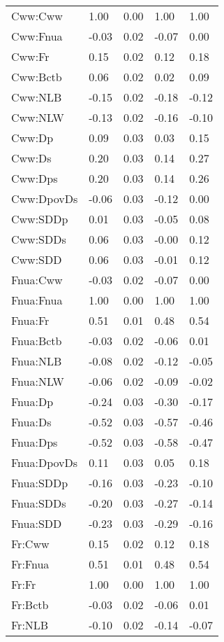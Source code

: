 \begin{center}
\begin{longtable}{|p{0.9in}|p{0.7in}|p{0.7in}|p{0.7in}|p{0.7in}|}
Cww:Cww & 1.00 & 0.00 & 1.00 & 1.00 \\ 
  Cww:Fnua & -0.03 & 0.02 & -0.07 & 0.00 \\ 
  Cww:Fr & 0.15 & 0.02 & 0.12 & 0.18 \\ 
  Cww:Bctb & 0.06 & 0.02 & 0.02 & 0.09 \\ 
  Cww:NLB & -0.15 & 0.02 & -0.18 & -0.12 \\ 
  Cww:NLW & -0.13 & 0.02 & -0.16 & -0.10 \\ 
  Cww:Dp & 0.09 & 0.03 & 0.03 & 0.15 \\ 
  Cww:Ds & 0.20 & 0.03 & 0.14 & 0.27 \\ 
  Cww:Dps & 0.20 & 0.03 & 0.14 & 0.26 \\ 
  Cww:DpovDs & -0.06 & 0.03 & -0.12 & 0.00 \\ 
  Cww:SDDp & 0.01 & 0.03 & -0.05 & 0.08 \\ 
  Cww:SDDs & 0.06 & 0.03 & -0.00 & 0.12 \\ 
  Cww:SDD & 0.06 & 0.03 & -0.01 & 0.12 \\ 
  Fnua:Cww & -0.03 & 0.02 & -0.07 & 0.00 \\ 
  Fnua:Fnua & 1.00 & 0.00 & 1.00 & 1.00 \\ 
  Fnua:Fr & 0.51 & 0.01 & 0.48 & 0.54 \\ 
  Fnua:Bctb & -0.03 & 0.02 & -0.06 & 0.01 \\ 
  Fnua:NLB & -0.08 & 0.02 & -0.12 & -0.05 \\ 
  Fnua:NLW & -0.06 & 0.02 & -0.09 & -0.02 \\ 
  Fnua:Dp & -0.24 & 0.03 & -0.30 & -0.17 \\ 
  Fnua:Ds & -0.52 & 0.03 & -0.57 & -0.46 \\ 
  Fnua:Dps & -0.52 & 0.03 & -0.58 & -0.47 \\ 
  Fnua:DpovDs & 0.11 & 0.03 & 0.05 & 0.18 \\ 
  Fnua:SDDp & -0.16 & 0.03 & -0.23 & -0.10 \\ 
  Fnua:SDDs & -0.20 & 0.03 & -0.27 & -0.14 \\ 
  Fnua:SDD & -0.23 & 0.03 & -0.29 & -0.16 \\ 
  Fr:Cww & 0.15 & 0.02 & 0.12 & 0.18 \\ 
  Fr:Fnua & 0.51 & 0.01 & 0.48 & 0.54 \\ 
  Fr:Fr & 1.00 & 0.00 & 1.00 & 1.00 \\ 
  Fr:Bctb & -0.03 & 0.02 & -0.06 & 0.01 \\ 
  Fr:NLB & -0.10 & 0.02 & -0.14 & -0.07 \\ 

\end{longtable}
\end{center}
